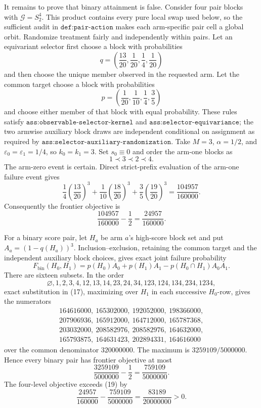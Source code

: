 It remains to prove that binary attainment is false. Consider four pair blocks with \(\mathcal G=S_2^4\). This product contains every pure local swap used below, so the sufficient audit in \(\texttt{def:pair-action}\) makes each arm-specific pair cell a global orbit. Randomize treatment fairly and independently within pairs. Let an equivariant selector first choose a block with probabilities
\[
q=\left(\frac{13}{20},\frac1{20},\frac14,\frac1{20}\right)
\tag{12}
\]
and then choose the unique member observed in the requested arm. Let the common target choose a block with probabilities
\[
p=\left(\frac1{20},\frac1{10},\frac14,\frac35\right)
\tag{13}
\]
and choose either member of that block with equal probability. These rules satisfy \(\texttt{ass:observable-selector-kernel}\) and \(\texttt{ass:selector-equivariance}\); the two armwise auxiliary block draws are independent conditional on assignment as required by \(\texttt{ass:selector-auxiliary-randomization}\). Take \(M=3\), \(\alpha=1/2\), and \(\varepsilon_0=\varepsilon_1=1/4\), so \(k_0=k_1=3\). Set \(s_0\equiv0\) and order the arm-one blocks as
\[
1\prec3\prec2\prec4.
\tag{14}
\]
The arm-zero event is certain. Direct strict-prefix evaluation of the arm-one failure event gives
\[
\frac14\left(\frac{13}{20}\right)^3
+
\frac1{10}\left(\frac{18}{20}\right)^3
+
\frac35\left(\frac{19}{20}\right)^3
=
\frac{104957}{160000}.
\tag{15}
\]
Consequently the frontier objective is
\[
\frac{104957}{160000}-\frac12
=
\frac{24957}{160000}.
\tag{16}
\]

For a binary score pair, let \(H_a\) be arm \(a\)'s high-score block set and put \(A_a=(1-q(H_a))^3\). Inclusion--exclusion, retaining the common target and the independent auxiliary block choices, gives exact joint failure probability
\[
F_{\mathrm{bin}}(H_0,H_1)
=
p(H_0)A_0+p(H_1)A_1-p(H_0\cap H_1)A_0A_1.
\tag{17}
\]
There are sixteen subsets. In the order
\[
\varnothing,1,2,3,4,12,13,14,23,24,34,123,124,134,234,1234,
\]
exact substitution in (17), maximizing over \(H_1\) in each successive \(H_0\)-row, gives the numerators
\[
\begin{gathered}
164616000,\ 165302000,\ 192052000,\ 198366000,\\
207906936,\ 165912000,\ 164712000,\ 165787368,\\
203032000,\ 208582976,\ 208582976,\ 164632000,\\
165793875,\ 164631423,\ 202894331,\ 164616000
\end{gathered}
\tag{18}
\]
over the common denominator \(320000000\). The maximum is \(3259109/5000000\). Hence every binary pair has frontier objective at most
\[
\frac{3259109}{5000000}-\frac12
=
\frac{759109}{5000000}.
\tag{19}
\]
The four-level objective exceeds (19) by
\[
\frac{24957}{160000}
-
\frac{759109}{5000000}
=
\frac{83189}{20000000}
>0.
\tag{20}
\]

